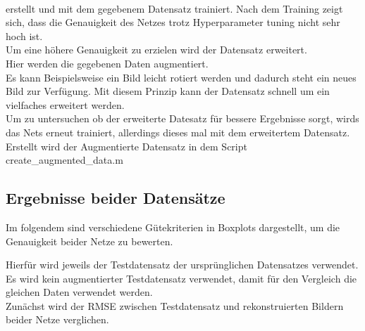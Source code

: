 \documentclass[8pt,a4paper]{article}
\begin{document}
\\

erstellt und mit dem gegebenem Datensatz trainiert.
Nach dem Training zeigt sich, dass die Genauigkeit des Netzes trotz Hyperparameter tuning nicht sehr hoch ist.\\
Um eine höhere Genauigkeit zu erzielen wird der Datensatz erweitert.\\
Hier werden die gegebenen Daten augmentiert.\\
Es kann Beispielsweise ein Bild leicht rotiert werden und dadurch steht ein neues Bild zur Verfügung.
Mit diesem Prinzip kann der Datensatz schnell um ein vielfaches erweitert werden.\\
Um zu untersuchen ob der erweiterte Datesatz für bessere Ergebnisse sorgt, wirds das Nets erneut trainiert, allerdings dieses mal mit dem erweitertem Datensatz.\\
Erstellt wird der Augmentierte Datensatz in dem Script create_augmented_data.m

\newpage
\subsection{Ergebnisse beider Datensätze}
Im folgendem sind verschiedene Gütekriterien in Boxplots dargestellt, um die Genauigkeit beider Netze zu bewerten.

Hierfür wird jeweils der Testdatensatz der ursprünglichen Datensatzes verwendet.\\
Es wird kein augmentierter Testdatensatz verwendet, damit für den Vergleich die gleichen Daten verwendet werden.\\

Zunächst wird der RMSE zwischen Testdatensatz und rekonstruierten Bildern beider Netze verglichen.\\
\end{document}
